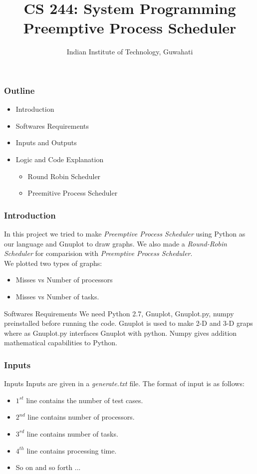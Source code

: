\documentclass[]{beamer}
\begin{document}
\title{CS 244: System Programming\\ Preemptive Process Scheduler}
\author{Indian Institute of Technology, Guwahati\\}
\begin{frame}
   \titlepage
\end{frame}
\begin{frame}
\frametitle{Outline}
\begin{itemize}
\item Introduction
\item Softwares Requirements
\item Inputs and Outputs
\item Logic and Code Explanation
	\begin{itemize}
	\item Round Robin Scheduler
	\item Preemitive Process Scheduler
	\end{itemize}

\end{itemize}
\end{frame}
\begin{frame}
\frametitle{Introduction}
In this project we tried to make \emph{Preemptive Process Scheduler} using Python as our language and Gnuplot to draw graphs. We also made a \emph{Round-Robin Scheduler} for comparision with \emph{Preemptive Process Scheduler}.\\ We plotted two types of graphs:
\begin{itemize}
\item Misses vs Number of processors
\item Misses vs Number of tasks.
\end{itemize}
\begin{block}{Softwares Requirements}
We need Python 2.7, Gnuplot, Gnuplot.py, numpy preinstalled before running the code. Gnuplot is used to make 2-D and 3-D graps where as Gnuplot.py interfaces Gnuplot with python. Numpy gives addition mathematical capabilities to Python.
\end{block}
\end{frame}
\begin{frame}
\frametitle{Inputs}
\begin{block}{Inputs}
Inputs are given in a \textit{generate.txt} file. The format of input is as follows:
\begin{itemize}
\item $1^{st}$ line contains the number of test cases.
\item $2^{nd}$ line contains number of processors.
\item $3^{rd}$ line contains number of tasks.
\item $4^{th}$ line contains processing time.
\item So on and so forth ...
\end{itemize}
\end{block}

\end{frame}
\end{document}
